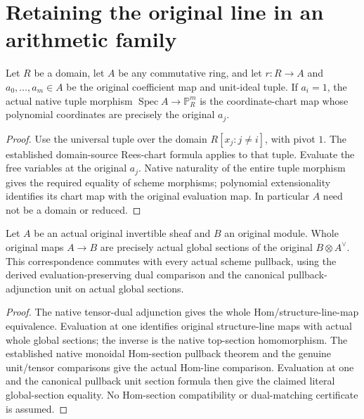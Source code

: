 \section{Retaining the original line in an arithmetic family}

\begin{lemma}
\label{lem:kn-arithmetic-original-line-chart}
\leanok
Let $R$ be a domain, let $A$ be any commutative ring, and let
$r:R\to A$ and $a_0,\ldots,a_m\in A$ be the original coefficient map and
unit-ideal tuple.  If $a_i=1$, the actual native tuple morphism
$\operatorname{Spec} A\to\mathbb P^m_R$ is the coordinate-chart map
whose polynomial coordinates are precisely the original $a_j$.
\end{lemma}
\begin{proof}
Use the universal tuple over the domain $R[x_j:j\ne i]$, with pivot $1$.
The established domain-source Rees-chart formula applies to that tuple.
Evaluate the free variables at the original $a_j$.  Native naturality of
the entire tuple morphism gives the required equality of scheme morphisms;
polynomial extensionality identifies its chart map with the original
evaluation map.  In particular $A$ need not be a domain or reduced.
\end{proof}

\begin{lemma}
\label{lem:kn-arithmetic-original-line-power-sections}
\leanok
Let $A$ be an actual original invertible sheaf and $B$ an original module.
Whole original maps $A\to B$ are precisely actual global sections of the
original $B\otimes A^\vee$.  This correspondence commutes with every actual
scheme pullback, using the derived evaluation-preserving dual comparison
and the canonical pullback-adjunction unit on actual global sections.
\end{lemma}
\begin{proof}
The native tensor-dual adjunction gives the whole Hom/structure-line-map
equivalence.  Evaluation at one identifies original structure-line maps
with actual whole global sections; the inverse is the native top-section
homomorphism.  The established native monoidal Hom-section pullback theorem
and the genuine unit/tensor comparisons give the actual Hom-line
comparison.  Evaluation at one and the canonical pullback unit section
formula then give the claimed literal global-section equality.  No
Hom-section compatibility or dual-matching certificate is assumed.
\end{proof}

